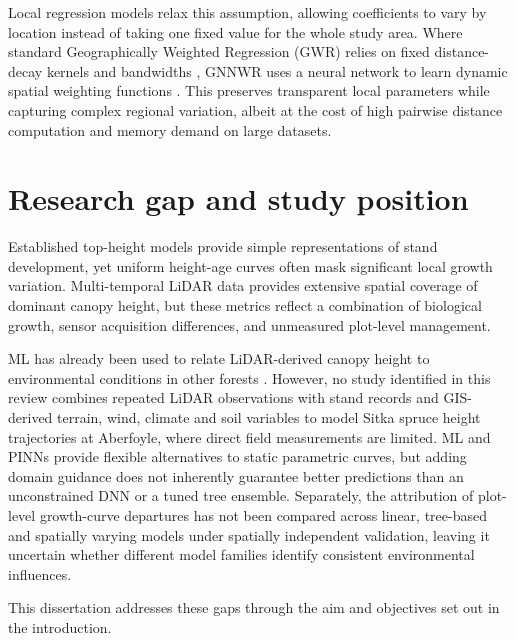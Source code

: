 Local regression models relax this assumption, allowing coefficients to vary by location instead of taking one fixed value for the whole study area. Where standard Geographically Weighted Regression (GWR) relies on fixed distance-decay kernels and bandwidths \citep{brunsdon1996Geographically_C6_GWR}, GNNWR uses a neural network to learn dynamic spatial weighting functions \citep{du2020Geographically_C6_GWR}. This preserves transparent local parameters while capturing complex regional variation, albeit at the cost of high pairwise distance computation and memory demand on large datasets.

\section{Research gap and study position}
\label{sec:background-gap}

Established top-height models provide simple representations of stand development, yet uniform height-age curves often mask significant local growth variation. Multi-temporal LiDAR data provides extensive spatial coverage of dominant canopy height, but these metrics reflect a combination of biological growth, sensor acquisition differences, and unmeasured plot-level management.

ML has already been used to relate LiDAR-derived canopy height to environmental conditions in other forests \citep{fricker2019More_C3_LID}. However, no study identified in this review combines repeated LiDAR observations with stand records and GIS-derived terrain, wind, climate and soil variables to model Sitka spruce height trajectories at Aberfoyle, where direct field measurements are limited. ML and PINNs provide flexible alternatives to static parametric curves, but adding domain guidance does not inherently guarantee better predictions than an unconstrained DNN or a tuned tree ensemble. Separately, the attribution of plot-level growth-curve departures has not been compared across linear, tree-based and spatially varying models under spatially independent validation, leaving it uncertain whether different model families identify consistent environmental influences.

This dissertation addresses these gaps through the aim and objectives set out in the introduction.


